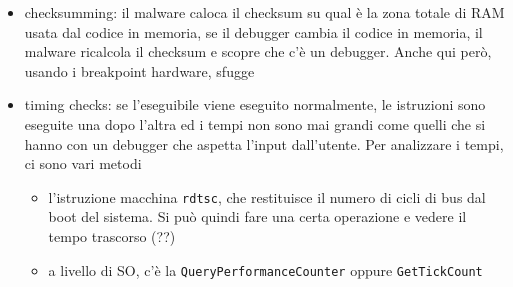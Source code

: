 \documentclass[12pt, oneside]{extbook}
\begin{document}
\begin{itemize}
\item checksumming: il malware caloca il checksum su qual è la zona totale di RAM usata dal codice in memoria, se il debugger cambia il codice in memoria, il malware ricalcola il checksum e scopre che c'è un debugger. Anche qui però, usando i breakpoint hardware, sfugge
\item timing checks: se l'eseguibile viene eseguito normalmente, le istruzioni sono eseguite una dopo l'altra ed i tempi non sono mai grandi come quelli che si hanno con un debugger che aspetta l'input dall'utente. Per analizzare i tempi, ci sono vari metodi
\begin{itemize}
\item l'istruzione macchina \texttt{rdtsc}, che restituisce il numero di cicli di bus dal boot del sistema. Si può quindi fare una certa operazione e vedere il tempo trascorso (??)
\item a livello di SO, c'è la \texttt{QueryPerformanceCounter} oppure \texttt{GetTickCount}
\end{itemize}
\end{itemize}
\end{document}
